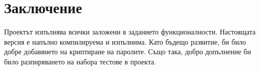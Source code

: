 \chapter{Заключение}

Проектът изпълнява всички заложени в заданието функционалности. Настоящата версия е напълно компилируема и изпълнима. Като бъдещо развитие, би било добре добавянето на криптиране на паролите. Също така, добро допълнение би било разпиряването на набора тестове в проекта.